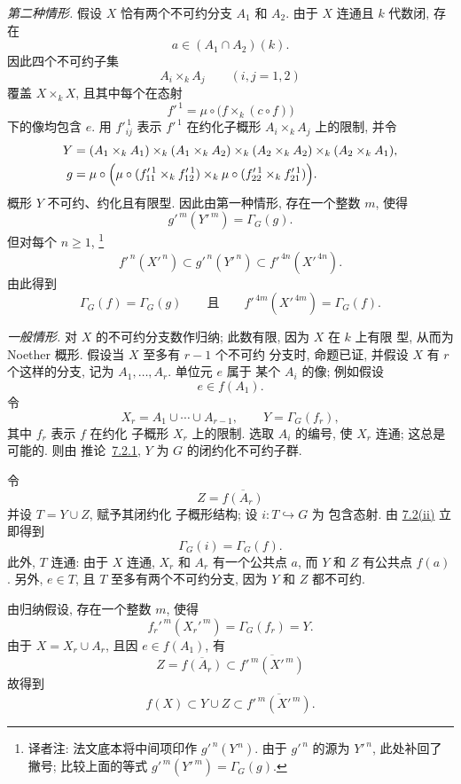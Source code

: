 \emph{第二种情形.}
假设 \(X\) 恰有两个不可约分支
\(A_1\) 和 \(A_2\). 由于 \(X\) 连通且 \(k\)
代数闭, 存在
\[
  a\in(A_1\cap A_2)(k).
\]
因此四个不可约子集
\[
  A_i\times_kA_j
  \qquad (i,j=1,2)
\]
覆盖 \(X\times_kX\), 且其中每个在态射
\[
  f'^{\,1}=\mu\circ\bigl(f\times_k(c\circ f)\bigr)
\]
下的像均包含 \(e\). 用 \(f'^{\,1}_{ij}\) 表示
\(f'^{\,1}\) 在约化子概形 \(A_i\times_kA_j\) 上的限制,
并令
\[
\begin{aligned}
  Y={}&
  (A_1\times_kA_1)
  \times_k(A_1\times_kA_2)
  \times_k(A_2\times_kA_2)
  \times_k(A_2\times_kA_1),\\
  g={}&
  \mu\circ\Bigl(
    \mu\circ
      (f'^{\,1}_{11}\times_k f'^{\,1}_{12})
    \times_k
    \mu\circ
      (f'^{\,1}_{22}\times_k f'^{\,1}_{21})
  \Bigr).
\end{aligned}
\]
概形 \(Y\) 不可约、约化且有限型.
因此由第一种情形, 存在一个整数 \(m\),
使得
\[
  g'^{\,m}(Y'^{\,m})=\Gamma_G(g).
\]
但对每个 \(n\geq1\),\begingroup
\renewcommand{\thefootnote}{\fnsymbol{footnote}}%
\footnote[1]{\label{note:sga3-VIB-7.4-Yprime}译者注:
法文底本将中间项印作 \(g'^{\,n}(Y^{\,n})\).
由于 \(g'^{\,n}\) 的源为 \(Y'^{\,n}\),
此处补回了撇号; 比较上面的等式
\(g'^{\,m}(Y'^{\,m})=\Gamma_G(g)\).}%
\endgroup
{}\label{form:sga3-VIB-7.4-two-component-chain}%
\[
  f'^{\,n}(X'^{\,n})
  \subset g'^{\,n}(Y'^{\,n})
  \subset f'^{\,4n}(X'^{\,4n}).
\]
由此得到
\[
  \Gamma_G(f)=\Gamma_G(g)
  \qquad\text{且}\qquad
  f'^{\,4m}(X'^{\,4m})=\Gamma_G(f).
\]

\emph{一般情形.}
对 \(X\) 的不可约分支数作归纳;
此数有限, 因为 \(X\) 在 \(k\) 上有限
型, 从而为 Noether 概形. 假设当 \(X\) 至多有 \(r-1\) 个不可约
分支时, 命题已证, 并假设 \(X\) 有 \(r\) 个这样的分支,
记为 \(A_1,\ldots,A_r\). 单位元 \(e\) 属于
某个 \(A_i\) 的像; 例如假设
\[
  e\in f(A_1).
\]
令
\[
  X_r=A_1\cup\cdots\cup A_{r-1},
  \qquad
  Y=\Gamma_G(f_r),
\]
其中 \(f_r\) 表示 \(f\) 在约化
子概形 \(X_r\) 上的限制. 选取 \(A_i\) 的编号,
使 \(X_r\) 连通; 这总是可能的. 则由
推论~\hyperref[cor:sga3-VIB-7.2.1]{7.2.1}, \(Y\)
为 \(G\) 的闭约化不可约子群.

令
\[
  Z=\overline{f(A_r)}
\]
并设 \(T=Y\cup Z\), 赋予其闭约化
子概形结构; 设 \(i:T\hookrightarrow G\) 为
包含态射. 由
\hyperref[rem:sga3-VIB-7.2-ii]{7.2\textup{(ii)}} 立即得到
\[
  \Gamma_G(i)=\Gamma_G(f).
\]
此外, \(T\) 连通: 由于 \(X\) 连通,
\(X_r\) 和 \(A_r\) 有一个公共点 \(a\), 而 \(Y\) 和
\(Z\) 有公共点 \(f(a)\). 另外, \(e\in T\), 且
\(T\) 至多有两个不可约分支, 因为 \(Y\)
和 \(Z\) 都不可约.

由归纳假设, 存在一个整数 \(m\),
使得
\[
  f_r'^{\,m}(X_r'^{\,m})
  =\Gamma_G(f_r)=Y.
\]
由于 \(X=X_r\cup A_r\), 且因
\(e\in f(A_1)\), 有
\[
  Z=\overline{f(A_r)}
  \subset\overline{f'^{\,m}(X'^{\,m})}
\]
故得到
\label{form:sga3-VIB-7.4-general-case-inclusion}%
\[
  f(X)
  \subset Y\cup Z
  \subset\overline{f'^{\,m}(X'^{\,m})}.
\]

